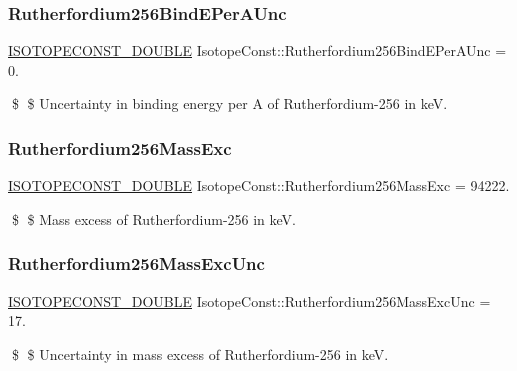 \subsubsection{\texorpdfstring{Rutherfordium256\+Bind\+E\+Per\+A\+Unc}{Rutherfordium256BindEPerAUnc}}
{\footnotesize\ttfamily \mbox{\hyperlink{group___isotope_const-_macros_ga8f45a7272ce02c0b4c65c44636ed719a}{I\+S\+O\+T\+O\+P\+E\+C\+O\+N\+S\+T\+\_\+\+D\+O\+U\+B\+LE}} Isotope\+Const\+::\+Rutherfordium256\+Bind\+E\+Per\+A\+Unc = 0.}

\$ \$ Uncertainty in binding energy per A of Rutherfordium-\/256 in keV. \mbox{\label{group___isotope_const-_rutherfordium-_rf256_ga14aebf62d24a6bded790e521585e6f2e}} 
\subsubsection{\texorpdfstring{Rutherfordium256\+Mass\+Exc}{Rutherfordium256MassExc}}
{\footnotesize\ttfamily \mbox{\hyperlink{group___isotope_const-_macros_ga8f45a7272ce02c0b4c65c44636ed719a}{I\+S\+O\+T\+O\+P\+E\+C\+O\+N\+S\+T\+\_\+\+D\+O\+U\+B\+LE}} Isotope\+Const\+::\+Rutherfordium256\+Mass\+Exc = 94222.}

\$ \$ Mass excess of Rutherfordium-\/256 in keV. \mbox{\label{group___isotope_const-_rutherfordium-_rf256_ga6cb361b48d3e6bde09fdf135b7bc620e}} 
\subsubsection{\texorpdfstring{Rutherfordium256\+Mass\+Exc\+Unc}{Rutherfordium256MassExcUnc}}
{\footnotesize\ttfamily \mbox{\hyperlink{group___isotope_const-_macros_ga8f45a7272ce02c0b4c65c44636ed719a}{I\+S\+O\+T\+O\+P\+E\+C\+O\+N\+S\+T\+\_\+\+D\+O\+U\+B\+LE}} Isotope\+Const\+::\+Rutherfordium256\+Mass\+Exc\+Unc = 17.}

\$ \$ Uncertainty in mass excess of Rutherfordium-\/256 in keV. \mbox{\label{group___isotope_const-_rutherfordium-_rf256_ga57e6802466f2870d34ce527cda469576}} 
